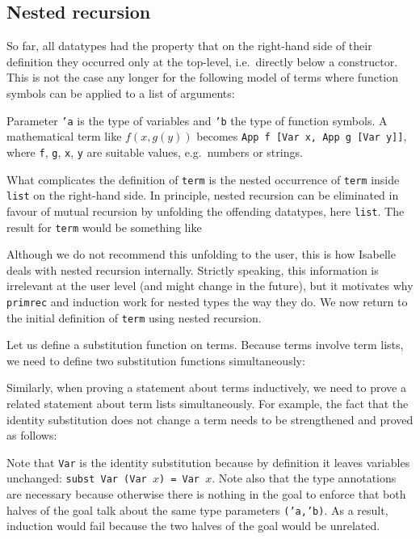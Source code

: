 \subsection{Nested recursion}

So far, all datatypes had the property that on the right-hand side of their
definition they occurred only at the top-level, i.e.\ directly below a
constructor. This is not the case any longer for the following model of terms
where function symbols can be applied to a list of arguments:
\begin{ttbox}
\end{ttbox}
Parameter \texttt{'a} is the type of variables and \texttt{'b} the type of
function symbols.
A mathematical term like $f(x,g(y))$ becomes \texttt{App f [Var x, App g
  [Var y]]}, where \texttt{f}, \texttt{g}, \texttt{x}, \texttt{y} are
suitable values, e.g.\ numbers or strings.

What complicates the definition of \texttt{term} is the nested occurrence of
\texttt{term} inside \texttt{list} on the right-hand side. In principle,
nested recursion can be eliminated in favour of mutual recursion by unfolding
the offending datatypes, here \texttt{list}. The result for \texttt{term}
would be something like
\begin{ttbox}
\end{ttbox}
Although we do not recommend this unfolding to the user, this is how Isabelle
deals with nested recursion internally. Strictly speaking, this information
is irrelevant at the user level (and might change in the future), but it
motivates why \texttt{primrec} and induction work for nested types the way
they do. We now return to the initial definition of \texttt{term} using
nested recursion.

Let us define a substitution function on terms. Because terms involve term
lists, we need to define two substitution functions simultaneously:
\begin{ttbox}


\end{ttbox}
Similarly, when proving a statement about terms inductively, we need
to prove a related statement about term lists simultaneously. For example,
the fact that the identity substitution does not change a term needs to be
strengthened and proved as follows:
\begin{quote}\small

\end{quote}
Note that \texttt{Var} is the identity substitution because by definition it
leaves variables unchanged: \texttt{subst Var (Var $x$) = Var $x$}. Note also
that the type annotations are necessary because otherwise there is nothing in
the goal to enforce that both halves of the goal talk about the same type
parameters \texttt{('a,'b)}. As a result, induction would fail
because the two halves of the goal would be unrelated.

